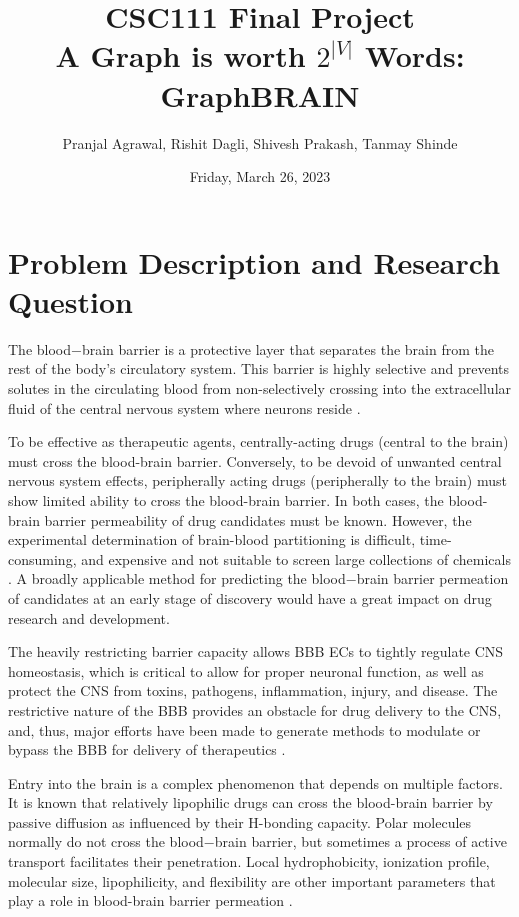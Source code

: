 \documentclass[fontsize=11pt]{article}
\title{CSC111 Final Project\\ A Graph is worth $2^{|V|}$ Words: GraphBRAIN}
\author{Pranjal Agrawal, Rishit Dagli, Shivesh Prakash, Tanmay Shinde}
\date{Friday, March 26, 2023}
\begin{document}
\maketitle

\section*{Problem Description and Research Question}

The blood$-$brain barrier is a protective layer that separates the brain from the rest of the body’s circulatory system. This barrier is highly selective and prevents solutes in the circulating blood from non-selectively crossing into the extracellular fluid of the central nervous system where neurons reside \citep{daneman2015blood}.

To be effective as therapeutic agents, centrally-acting drugs (central to the brain) must cross the blood-brain barrier. Conversely, to be devoid of unwanted central nervous system effects, peripherally acting drugs (peripherally to the brain) must show limited ability to cross the blood-brain barrier. In both cases, the blood-brain barrier permeability of drug candidates must be known. However, the experimental determination of brain-blood partitioning is difficult, time-consuming, and expensive and not suitable to screen large collections of chemicals \citep{thai2020fast}. A broadly applicable method for predicting the blood$-$brain barrier permeation of candidates at an early stage of discovery would have a great impact on drug research and development. 

The heavily restricting barrier capacity allows BBB ECs to tightly regulate CNS homeostasis, which is critical to allow for proper neuronal function, as well as protect the CNS from toxins, pathogens, inflammation, injury, and disease. The restrictive nature of the BBB provides an obstacle for drug delivery to the CNS, and, thus, major efforts have been made to generate methods to modulate or bypass the BBB for delivery of therapeutics \citep{daneman2015blood}.

Entry into the brain is a complex phenomenon that depends on multiple factors. It is known that relatively lipophilic drugs can cross the blood-brain barrier by passive diffusion as influenced by their H-bonding capacity. Polar molecules normally do not cross the blood$-$brain barrier, but sometimes a process of active transport facilitates their penetration. Local hydrophobicity, ionization profile, molecular size, lipophilicity, and flexibility are other important parameters that play a role in blood-brain barrier permeation \citep{crivori2000predicting}.
\end{document}

